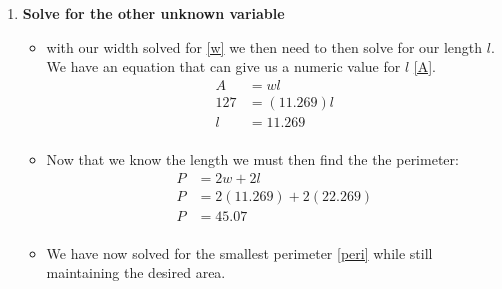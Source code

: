 \documentclass[12pt]{article}
\begin{document}
\begin{enumerate}
  \item \textbf{Solve for the other unknown variable}
    \begin{itemize}
      \item with our width solved for \eqref{w} we then need to then solve for our length $l$. We have an equation that can give us a numeric value for $l$ \eqref{A}.
      \begin{equation}
        \begin{split}
          A &= wl\\
          127 &= (11.269) l\\
          l &= 11.269\\
        \end{split}
        \tag {Length} \tag{l}
      \end{equation}
      \item Now that we know the length we must then find the the perimeter:
      \begin{equation}
        \begin{split}
          P &= 2w + 2l\\
          P &= 2(11.269) + 2(22.269)\\
          P &= 45.07\\
        \end{split}
        \tag {Perimeter} \label{peri}
      \end{equation}
      \item We have now solved for the smallest perimeter \eqref{peri} while still maintaining the desired area.
    \end{itemize}
  \end{enumerate}
\end{document}
